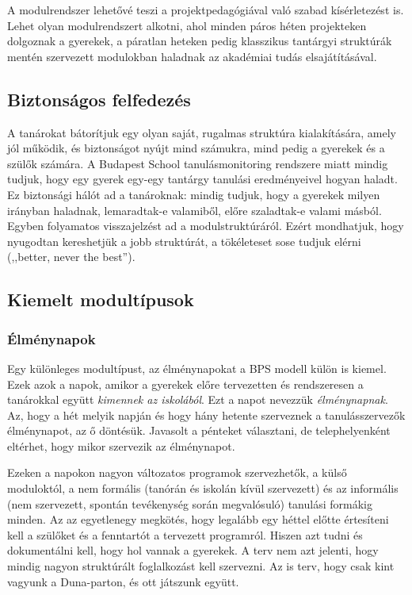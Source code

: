 A modulrendszer lehetővé teszi a projektpedagógiával való szabad
kísérletezést is. Lehet olyan modulrendszert alkotni, ahol minden páros
héten projekteken dolgoznak a gyerekek, a páratlan heteken pedig
klasszikus tantárgyi struktúrák mentén szervezett modulokban haladnak az
akadémiai tudás elsajátításával.

\hypertarget{biztonsagos-felfedezes}{%
\subsection{Biztonságos felfedezés}\label{biztonsagos-felfedezes}}

A tanárokat bátorítjuk egy olyan saját, rugalmas struktúra
kialakítására, amely jól működik, és biztonságot nyújt mind számukra,
mind pedig a gyerekek és a szülők számára. A Budapest School tanulásmonitoring rendszere miatt mindig tudjuk, hogy egy gyerek egy-egy
tantárgy tanulási eredményeivel hogyan haladt. Ez biztonsági hálót ad a
tanároknak: mindig tudjuk, hogy a gyerekek milyen irányban haladnak,
lemaradtak-e valamiből, előre szaladtak-e valami másból. Egyben
folyamatos visszajelzést ad a modulstruktúráról. Ezért mondhatjuk, hogy
nyugodtan kereshetjük a jobb struktúrát, a tökéleteset sose tudjuk
elérni (,,better, never the best'').

\hypertarget{kiemelt-modultipusok}{%
\subsection{Kiemelt modultípusok}\label{kiemelt-modultipusok}}

\hypertarget{elmenynapok}{%
\subsubsection{Élménynapok}\label{elmenynapok}}

Egy különleges modultípust, az élménynapokat a BPS modell külön is
kiemel. Ezek azok a napok, amikor a gyerekek előre tervezetten és
rendszeresen a tanárokkal együtt \emph{kimennek az iskolából}. Ezt a
napot nevezzük \emph{élménynapnak}. Az, hogy a hét melyik napján és hogy
hány hetente szerveznek a tanulásszervezők élménynapot, az ő
döntésük. Javasolt a pénteket választani, de telephelyenként eltérhet,
hogy mikor szervezik az élménynapot.

Ezeken a napokon nagyon változatos programok szervezhetők, a külső
moduloktól, a nem formális (tanórán és iskolán kívül szervezett) és az
informális (nem szervezett, spontán tevékenység során megvalósuló)
tanulási formákig minden. Az az egyetlenegy megkötés, hogy legalább egy
héttel előtte értesíteni kell a szülőket és a fenntartót a tervezett
programról. Hiszen azt tudni és dokumentálni kell, hogy hol vannak a
gyerekek. A terv nem azt jelenti, hogy mindig nagyon struktúrált
foglalkozást kell szervezni. Az is terv, hogy csak kint vagyunk a Duna-parton, és ott játszunk együtt.

